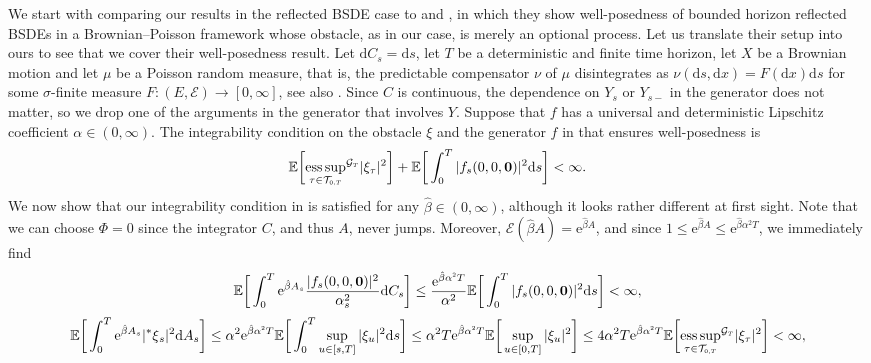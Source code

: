 \documentclass[10pt]{article} %
\newcommand\cE{\mathcal E}
\newcommand\cG{\mathcal G}
\newcommand\cT{\mathcal T}
\newcommand{\smalltext}[1]{\text{\fontsize{4}{4}\selectfont$#1$}}
\def \E{\mathbb{E}}
\newcommand{\brs}[1]{\prescript{\ast}{}{#1}}
\def\d{\mathrm{d}}
\DeclareMathOperator*{\esssup}{ess\,sup}
\begin{document}
We start with comparing our results in the reflected BSDE case to \citeauthor*{grigorova2017reflected} \cite{grigorova2017reflected} and \citeauthor*{grigorova2020optimal} \cite{grigorova2020optimal}, in which they show well-posedness of bounded horizon reflected BSDEs in a Brownian--Poisson framework whose obstacle, as in our case, is merely an optional process. Let us translate their setup into ours to see that we cover their well-posedness result. Let $\d C_s = \d s$, let $T$ be a deterministic and finite time horizon, let $X$ be a Brownian motion and let $\mu$ be a Poisson random measure, that is, the predictable compensator $\nu$ of $\mu$ disintegrates as $\nu(\d s, \d x) = F(\d x) \d s$ for some $\sigma$-finite measure $F : (E,\cE) \longrightarrow [0,\infty]$, see also \cite{jacod1979calcul,jacod2003limit}. Since $C$ is continuous, the dependence on $Y_s$ or $Y_{s-}$ in the generator does not matter, so we drop one of the arguments in the generator that involves $Y$. Suppose that $f$ has a universal and deterministic Lipschitz coefficient $\alpha \in (0,\infty)$. The integrability condition on the obstacle $\xi$ and the generator $f$ in \cite{grigorova2017reflected,grigorova2020optimal} that ensures well-posedness is
\begin{equation*}
	\E\bigg[{\esssup_{\tau \in \cT_{\smalltext{0}\smalltext{,}\smalltext{T}}}}^{\cG_\smalltext{T}}|\xi_\tau|^2\bigg] + \E \bigg[ \int_0^T |f_s(0,0,\mathbf{0})|^2 \d s \bigg] < \infty.
\end{equation*}
We now show that our integrability condition in  is satisfied for any $\hat\beta \in (0,\infty)$, although it looks rather different at first sight. Note that we can choose $\Phi = 0$ since the integrator $C$, and thus $A$, never jumps. Moreover, $\cE(\hat\beta A) = \mathrm{e}^{\hat\beta A}$, and since $1 \leq \mathrm{e}^{\hat\beta A} \leq \mathrm{e}^{\hat\beta\alpha^2T}$, we immediately find
\begin{equation*}
	\E\bigg[\int_0^T \mathrm{e}^{\hat\beta A_s} \frac{|f_s(0,0,\mathbf{0})|^2}{\alpha^2_s}\d C_s\bigg] \leq \frac{\mathrm{e}^{\hat\beta \alpha^\smalltext{2}T}}{\alpha^2} \E \bigg[\int_0^T |f_s(0,0,\mathbf{0})|^2\mathrm{d}s\bigg] < \infty,
\end{equation*}
\begin{equation*}
	\E\bigg[ \int_0^T \mathrm{e}^{\hat\beta A_s} |\!\brs{\xi}_s|^2 \d A_s \bigg]
	\leq \alpha^2\mathrm{e}^{\hat\beta \alpha^\smalltext{2} T}\E\bigg[ \int_0^T \sup_{u \in [s,T]}|\xi_u|^2 \d s \bigg] 
	\leq \alpha^2T\mathrm{e}^{\hat\beta \alpha^\smalltext{2} T}\E\bigg[ \sup_{u \in [0,T]}|\xi_u|^2 \bigg]  
	\leq 4\alpha^2T\mathrm{e}^{\hat\beta \alpha^\smalltext{2} T}\E \bigg[ {\esssup_{\tau \in \cT_{\smalltext{0}\smalltext{,}\smalltext{T}}}}^{\cG_\smalltext{T}} |\xi_\tau|^2 \bigg] < \infty,
\end{equation*}
\end{document}
